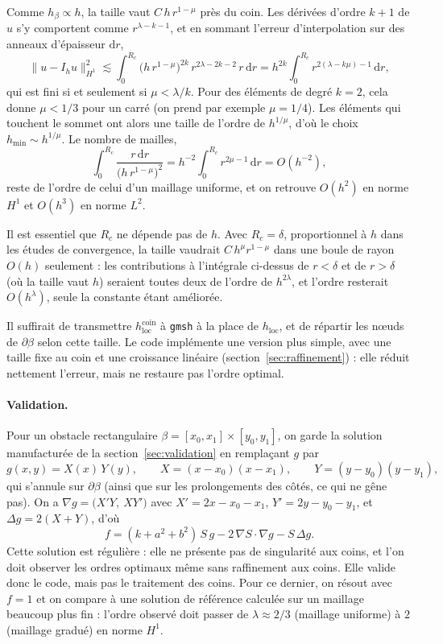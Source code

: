 \documentclass[11pt,a4paper]{article}
\begin{document}
Comme $h_\beta \propto h$, la taille vaut $C\,h\,r^{1-\mu}$ près du coin.
Les dérivées d'ordre $k+1$ de $u$ s'y comportent comme $r^{\lambda - k - 1}$,
et en sommant l'erreur d'interpolation sur des anneaux d'épaisseur
$\mathrm{d}r$,
\[
\|u - I_h u\|_{H^1}^2 \lesssim \int_0^{R_c} \big(h\,r^{1-\mu}\big)^{2k}\,
r^{2\lambda - 2k - 2}\, r\,\mathrm{d}r
= h^{2k} \int_0^{R_c} r^{2(\lambda - k\mu) - 1}\,\mathrm{d}r ,
\]
qui est fini si et seulement si $\mu < \lambda / k$. Pour des éléments de
degré $k = 2$, cela donne $\mu < 1/3$ pour un carré (on prend par exemple
$\mu = 1/4$). Les éléments qui touchent le sommet ont alors une taille de
l'ordre de $h^{1/\mu}$, d'où le choix $h_{\min} \sim h^{1/\mu}$. Le nombre
de mailles,
\[
\int_0^{R_c} \frac{r\,\mathrm{d}r}{\big(h\,r^{1-\mu}\big)^2}
= h^{-2} \int_0^{R_c} r^{2\mu - 1}\,\mathrm{d}r = O(h^{-2}),
\]
reste de l'ordre de celui d'un maillage uniforme, et on retrouve $O(h^2)$ en norme $H^1$ et $O(h^3)$
en norme $L^2$.

Il est essentiel que $R_c$ ne dépende pas de $h$. Avec $R_c = \delta$,
proportionnel à $h$ dans les études de convergence, la taille vaudrait
$C\,h^{\mu} r^{1-\mu}$ dans une boule de rayon $O(h)$ seulement : les
contributions à l'intégrale ci-dessus de $r < \delta$ et de $r > \delta$
(où la taille vaut $h$) seraient toutes deux de l'ordre de $h^{2\lambda}$,
et l'ordre resterait $O(h^\lambda)$, seule la constante étant améliorée.

Il suffirait de transmettre $h_{\mathrm{loc}}^{\mathrm{coin}}$ à
\texttt{gmsh} à la place de $h_{\mathrm{loc}}$, et de répartir les nœuds de
$\partial\beta$ selon cette taille. Le code implémente une version plus
simple, avec une taille fixe au coin et une croissance linéaire
(section~\ref{sec:raffinement}) : elle réduit nettement l'erreur, mais ne
restaure pas l'ordre optimal.

\paragraph{Validation.} Pour un obstacle rectangulaire
$\beta = [x_0, x_1] \times [y_0, y_1]$, on garde la solution manufacturée de
la section~\ref{sec:validation} en remplaçant $g$ par
\[
g(x,y) = X(x)\,Y(y),
\qquad X = (x - x_0)(x - x_1),
\qquad Y = (y - y_0)(y - y_1),
\]
qui s'annule sur $\partial\beta$ (ainsi que sur les prolongements des côtés,
ce qui ne gêne pas). On a $\nabla g = \big(X' Y,\ X Y'\big)$ avec
$X' = 2x - x_0 - x_1$, $Y' = 2y - y_0 - y_1$, et $\Delta g = 2(X + Y)$, d'où
\[
f = (k + a^2 + b^2)\, S\, g - 2\, \nabla S \cdot \nabla g - S\, \Delta g .
\]
Cette solution est régulière : elle ne présente pas de singularité aux coins,
et l'on doit observer les ordres optimaux même sans raffinement aux coins.
Elle valide donc le code, mais pas le traitement des coins. Pour ce dernier,
on résout avec $f = 1$ et on compare à une solution de référence calculée sur
un maillage beaucoup plus fin : l'ordre observé doit passer de
$\lambda \approx 2/3$ (maillage uniforme) à $2$ (maillage gradué) en norme
$H^1$.
\end{document}
